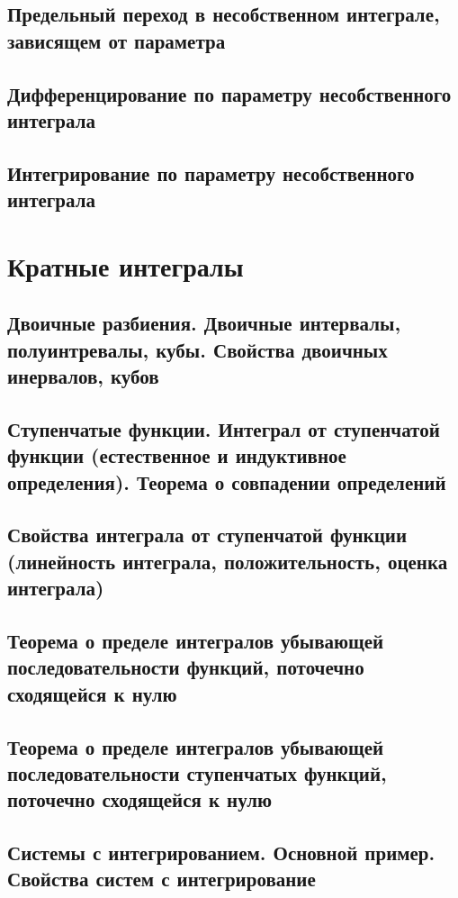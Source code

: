 \documentclass[a4paper]{article}
\theoremstyle{definition}
\theoremstyle{remark}
\begin{document}
    \subsection{	Предельный переход в несобственном интеграле, зависящем от параметра}
    \subsection{	Дифференцирование  по параметру несобственного интеграла}
    \subsection{	Интегрирование по параметру несобственного интеграла}
    
    \section{Кратные интегралы}
    \subsection{ Двоичные разбиения. Двоичные интервалы, полуинтревалы, кубы. Свойства двоичных инервалов, кубов}
    \subsection{ Ступенчатые функции. Интеграл от ступенчатой функции (естественное и индуктивное определения). Теорема о совпадении определений}
    \subsection{ Свойства интеграла от ступенчатой функции (линейность интеграла, положительность, оценка интеграла)}
    \subsection{ Теорема о пределе интегралов убывающей последовательности функций, поточечно сходящейся к нулю}
    \subsection{ Теорема о пределе интегралов убывающей последовательности ступенчатых функций, поточечно сходящейся к нулю}
    \subsection{ Системы с интегрированием. Основной пример. Свойства систем с интегрирование}
\end{document}
